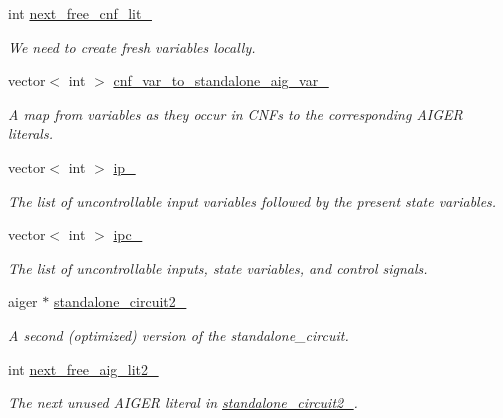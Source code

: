 \begin{DoxyCompactItemize}
int \hyperlink{classParExtractorWorker_a71f5c8e875908f12f60964ec17e2b203}{next\-\_\-free\-\_\-cnf\-\_\-lit\-\_\-}
\begin{DoxyCompactList}\small\item\em We need to create fresh variables locally. \end{DoxyCompactList}\item 
vector$<$ int $>$ \hyperlink{classParExtractorWorker_a90ef43d28785c5c5607159ddc7b54ce3}{cnf\-\_\-var\-\_\-to\-\_\-standalone\-\_\-aig\-\_\-var\-\_\-}
\begin{DoxyCompactList}\small\item\em A map from variables as they occur in C\-N\-Fs to the corresponding A\-I\-G\-E\-R literals. \end{DoxyCompactList}\item 
vector$<$ int $>$ \hyperlink{classParExtractorWorker_ab1385a3c5d2f203f6a1dbaf1ed6b5fcd}{ip\-\_\-}
\begin{DoxyCompactList}\small\item\em The list of uncontrollable input variables followed by the present state variables. \end{DoxyCompactList}\item 
vector$<$ int $>$ \hyperlink{classParExtractorWorker_ae9deb9eac6b36f87f299d1eca77351d5}{ipc\-\_\-}
\begin{DoxyCompactList}\small\item\em The list of uncontrollable inputs, state variables, and control signals. \end{DoxyCompactList}\item 
aiger $\ast$ \hyperlink{classParExtractorWorker_a304c66039a45652e273876f7c6da8bcf}{standalone\-\_\-circuit2\-\_\-}
\begin{DoxyCompactList}\small\item\em A second (optimized) version of the standalone\-\_\-circuit. \end{DoxyCompactList}\item 
int \hyperlink{classParExtractorWorker_a334b3096ea7cdb2b3305ac3960aa065a}{next\-\_\-free\-\_\-aig\-\_\-lit2\-\_\-}
\begin{DoxyCompactList}\small\item\em The next unused A\-I\-G\-E\-R literal in \hyperlink{classParExtractorWorker_a304c66039a45652e273876f7c6da8bcf}{standalone\-\_\-circuit2\-\_\-}. \end{DoxyCompactList}\end{DoxyCompactItemize}
